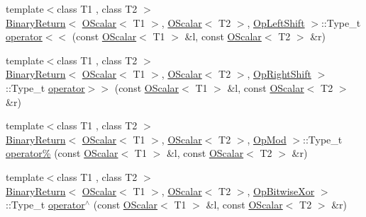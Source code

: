 \begin{DoxyCompactItemize}
\item 
{\footnotesize template$<$class T1 , class T2 $>$ }\\\mbox{\hyperlink{structENSEM_1_1BinaryReturn}{Binary\+Return}}$<$ \mbox{\hyperlink{classENSEM_1_1OScalar}{O\+Scalar}}$<$ T1 $>$, \mbox{\hyperlink{classENSEM_1_1OScalar}{O\+Scalar}}$<$ T2 $>$, \mbox{\hyperlink{structENSEM_1_1OpLeftShift}{Op\+Left\+Shift}} $>$\+::Type\+\_\+t \mbox{\hyperlink{group__obsscalar_ga4e9caae1c3f8de5f5a7066462fdbd391}{operator$<$$<$}} (const \mbox{\hyperlink{classENSEM_1_1OScalar}{O\+Scalar}}$<$ T1 $>$ \&l, const \mbox{\hyperlink{classENSEM_1_1OScalar}{O\+Scalar}}$<$ T2 $>$ \&r)
\item 
{\footnotesize template$<$class T1 , class T2 $>$ }\\\mbox{\hyperlink{structENSEM_1_1BinaryReturn}{Binary\+Return}}$<$ \mbox{\hyperlink{classENSEM_1_1OScalar}{O\+Scalar}}$<$ T1 $>$, \mbox{\hyperlink{classENSEM_1_1OScalar}{O\+Scalar}}$<$ T2 $>$, \mbox{\hyperlink{structENSEM_1_1OpRightShift}{Op\+Right\+Shift}} $>$\+::Type\+\_\+t \mbox{\hyperlink{group__obsscalar_ga015e8600020030e6443b821a8064e644}{operator$>$$>$}} (const \mbox{\hyperlink{classENSEM_1_1OScalar}{O\+Scalar}}$<$ T1 $>$ \&l, const \mbox{\hyperlink{classENSEM_1_1OScalar}{O\+Scalar}}$<$ T2 $>$ \&r)
\item 
{\footnotesize template$<$class T1 , class T2 $>$ }\\\mbox{\hyperlink{structENSEM_1_1BinaryReturn}{Binary\+Return}}$<$ \mbox{\hyperlink{classENSEM_1_1OScalar}{O\+Scalar}}$<$ T1 $>$, \mbox{\hyperlink{classENSEM_1_1OScalar}{O\+Scalar}}$<$ T2 $>$, \mbox{\hyperlink{structENSEM_1_1OpMod}{Op\+Mod}} $>$\+::Type\+\_\+t \mbox{\hyperlink{group__obsscalar_ga8cba513c40a3014718affb28b883351e}{operator\%}} (const \mbox{\hyperlink{classENSEM_1_1OScalar}{O\+Scalar}}$<$ T1 $>$ \&l, const \mbox{\hyperlink{classENSEM_1_1OScalar}{O\+Scalar}}$<$ T2 $>$ \&r)
\item 
{\footnotesize template$<$class T1 , class T2 $>$ }\\\mbox{\hyperlink{structENSEM_1_1BinaryReturn}{Binary\+Return}}$<$ \mbox{\hyperlink{classENSEM_1_1OScalar}{O\+Scalar}}$<$ T1 $>$, \mbox{\hyperlink{classENSEM_1_1OScalar}{O\+Scalar}}$<$ T2 $>$, \mbox{\hyperlink{structENSEM_1_1OpBitwiseXor}{Op\+Bitwise\+Xor}} $>$\+::Type\+\_\+t \mbox{\hyperlink{group__obsscalar_gaa01a2cce660b21ea1e2ea9a876a1cd03}{operator$^\wedge$}} (const \mbox{\hyperlink{classENSEM_1_1OScalar}{O\+Scalar}}$<$ T1 $>$ \&l, const \mbox{\hyperlink{classENSEM_1_1OScalar}{O\+Scalar}}$<$ T2 $>$ \&r)
\item 

\end{DoxyCompactItemize}

